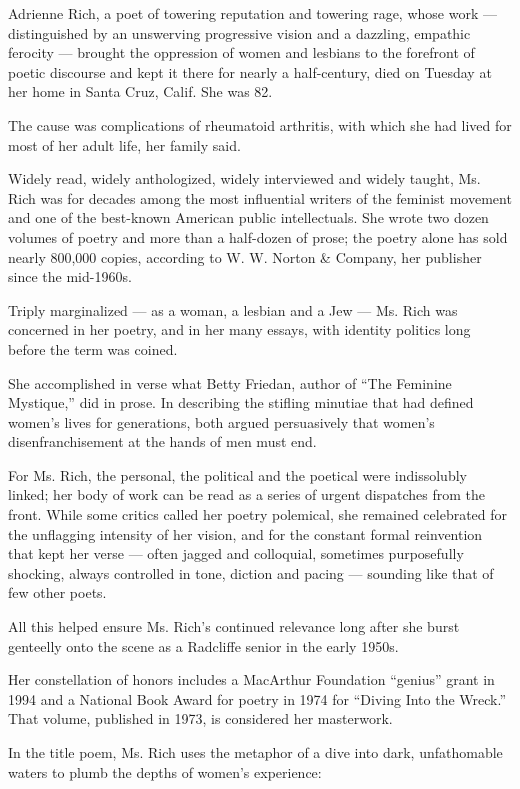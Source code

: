 Adrienne Rich, a poet of towering reputation and towering rage, whose
work --- distinguished by an unswerving progressive vision and a
dazzling, empathic ferocity --- brought the oppression of women and
lesbians to the forefront of poetic discourse and kept it there for
nearly a half-century, died on Tuesday at her home in Santa Cruz, Calif.
She was 82.

The cause was complications of rheumatoid arthritis, with which she had
lived for most of her adult life, her family said.

Widely read, widely anthologized, widely interviewed and widely taught,
Ms. Rich was for decades among the most influential writers of the
feminist movement and one of the best-known American public
intellectuals. She wrote two dozen volumes of poetry and more than a
half-dozen of prose; the poetry alone has sold nearly 800,000 copies,
according to W. W. Norton \& Company, her publisher since the mid-1960s.

Triply marginalized --- as a woman, a lesbian and a Jew --- Ms. Rich was
concerned in her poetry, and in her many essays, with identity politics
long before the term was coined.

She accomplished in verse what Betty Friedan, author of ``The Feminine
Mystique,'' did in prose. In describing the stifling minutiae that had
defined women's lives for generations, both argued persuasively that
women's disenfranchisement at the hands of men must end.

For Ms. Rich, the personal, the political and the poetical were
indissolubly linked; her body of work can be read as a series of urgent
dispatches from the front. While some critics called her poetry
polemical, she remained celebrated for the unflagging intensity of her
vision, and for the constant formal reinvention that kept her verse ---
often jagged and colloquial, sometimes purposefully shocking, always
controlled in tone, diction and pacing --- sounding like that of few
other poets.

All this helped ensure Ms. Rich's continued relevance long after she
burst genteelly onto the scene as a Radcliffe senior in the early 1950s.

Her constellation of honors includes a MacArthur Foundation ``genius''
grant in 1994 and a National Book Award for poetry in 1974 for ``Diving
Into the Wreck.'' That volume, published in 1973, is considered her
masterwork.

In the title poem, Ms. Rich uses the metaphor of a dive into dark,
unfathomable waters to plumb the depths of women's experience:

